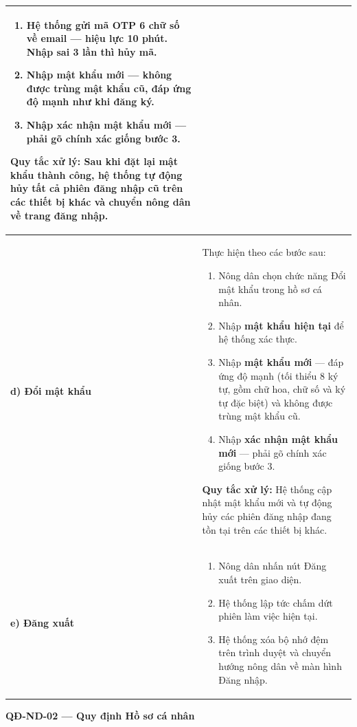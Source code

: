 \documentclass[12pt,a4paper]{article}
\begin{document}
\begin{longtable}{|
    >{\raggedright\arraybackslash}p{2.8cm}|
    >{\raggedright\arraybackslash}p{12cm}|}
\begin{enumerate}[leftmargin=*,topsep=2pt,itemsep=1pt]
    \item Hệ thống gửi \textbf{mã OTP} 6 chữ số về email --- hiệu lực 10 phút. Nhập sai 3 lần thì hủy mã.
    \item Nhập \textbf{mật khẩu mới} --- không được trùng mật khẩu cũ, đáp ứng độ mạnh như khi đăng ký.
    \item Nhập \textbf{xác nhận mật khẩu mới} --- phải gõ chính xác giống bước 3.
\end{enumerate}
\textbf{Quy tắc xử lý:} Sau khi đặt lại mật khẩu thành công, hệ thống tự động hủy tất cả phiên đăng nhập cũ trên các thiết bị khác và chuyển nông dân về trang đăng nhập. \\
\hline
\textbf{d) Đổi mật khẩu} &
Thực hiện theo các bước sau:
\begin{enumerate}[leftmargin=*,topsep=2pt,itemsep=1pt]
    \item Nông dân chọn chức năng Đổi mật khẩu trong hồ sơ cá nhân.
    \item Nhập \textbf{mật khẩu hiện tại} để hệ thống xác thực.
    \item Nhập \textbf{mật khẩu mới} --- đáp ứng độ mạnh (tối thiểu 8 ký tự, gồm chữ hoa, chữ số và ký tự đặc biệt) và không được trùng mật khẩu cũ.
    \item Nhập \textbf{xác nhận mật khẩu mới} --- phải gõ chính xác giống bước 3.
\end{enumerate}
\textbf{Quy tắc xử lý:} Hệ thống cập nhật mật khẩu mới và tự động hủy các phiên đăng nhập đang tồn tại trên các thiết bị khác. \\
\hline
\textbf{e) Đăng xuất} &
\begin{enumerate}[leftmargin=*,topsep=2pt,itemsep=1pt]
    \item Nông dân nhấn nút Đăng xuất trên giao diện.
    \item Hệ thống lập tức chấm dứt phiên làm việc hiện tại.
    \item Hệ thống xóa bộ nhớ đệm trên trình duyệt và chuyển hướng nông dân về màn hình Đăng nhập.
\end{enumerate} \\
\hline
\end{longtable}
 
\vspace{0.3cm}
\noindent\textbf{QĐ-ND-02 --- Quy định Hồ sơ cá nhân}
 
\end{document}

